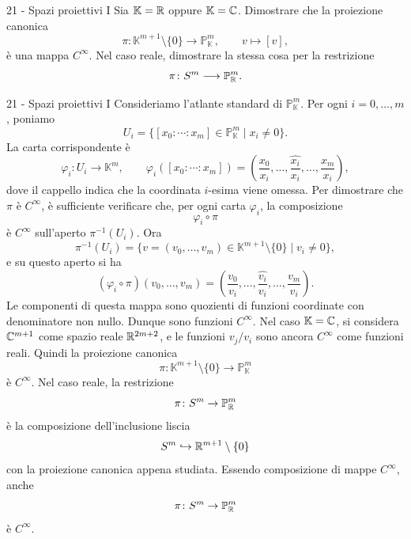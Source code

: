 \documentclass[a4paper]{article}
\begin{document}
\begin{snippetexercise}{21 - Spazi proiettivi I}
    Sia \(\mathbb{K}=\mathbb{R}\) oppure
    \(\mathbb{K}=\mathbb{C}\). Dimostrare che la proiezione canonica
    \[
        \pi\colon \mathbb{K}^{m+1}\setminus\{0\}\longrightarrow
        \mathbb{P}^m_{\mathbb{K}},
        \qquad
        v\longmapsto [v],
    \]
    è una mappa \(C^\infty\). Nel caso reale, dimostrare la stessa cosa
    per la restrizione
    \[
        \pi\colon S^m\longrightarrow \mathbb{P}^m_{\mathbb{R}}.
    \]
\end{snippetexercise}

\begin{snippetsolution}{21 - Spazi proiettivi I}
    Consideriamo l'atlante standard di \(\mathbb{P}^m_{\mathbb{K}}\). Per ogni \(i=0,\dots,m\), poniamo
    \[
        U_i=\{[x_0:\cdots:x_m]\in\mathbb{P}^m_{\mathbb{K}}\mid x_i\neq0\}.
    \]
    La carta corrispondente è
    \[
        \varphi_i\colon U_i\to\mathbb{K}^m,
        \qquad
        \varphi_i([x_0:\cdots:x_m])
        =
        \left(
            \frac{x_0}{x_i},\dots,\widehat{\frac{x_i}{x_i}},\dots,\frac{x_m}{x_i}
        \right),
    \]
    dove il cappello indica che la coordinata \(i\)-esima viene omessa.
    Per dimostrare che \(\pi\) è \(C^\infty\), è sufficiente verificare che, per ogni carta \(\varphi_i\), la composizione
    \[
        \varphi_i\circ\pi
    \]
    è \(C^\infty\) sull'aperto \(\pi^{-1}(U_i)\). Ora
    \[
        \pi^{-1}(U_i)=\{v=(v_0,\dots,v_m)\in\mathbb{K}^{m+1}\setminus\{0\}\mid v_i\neq0\},
    \]
    e su questo aperto si ha
    \[
        (\varphi_i\circ\pi)(v_0,\dots,v_m)
        =
        \left(
            \frac{v_0}{v_i},\dots,\widehat{\frac{v_i}{v_i}},\dots,\frac{v_m}{v_i}
        \right).
    \]
    Le componenti di questa mappa sono quozienti di funzioni coordinate con denominatore non nullo. Dunque sono funzioni \(C^\infty\). Nel caso \(\mathbb{K}=\mathbb{C}\), si considera \(\mathbb{C}^{m+1}\) come spazio reale \(\mathbb{R}^{2m+2}\), e le funzioni \(v_j/v_i\) sono ancora \(C^\infty\) come funzioni reali. Quindi la proiezione canonica
    \[
        \pi\colon \mathbb{K}^{m+1}\setminus\{0\}\to\mathbb{P}^m_{\mathbb{K}}
    \]
    è \(C^\infty\).
    Nel caso reale, la restrizione
    \[
        \pi\colon S^m\to\mathbb{P}^m_{\mathbb{R}}
    \]
    è la composizione dell'inclusione liscia
    \[
        S^m\hookrightarrow \mathbb{R}^{m+1}\setminus\{0\}
    \]
    con la proiezione canonica appena studiata. Essendo composizione di mappe \(C^\infty\), anche
    \[
        \pi\colon S^m\to\mathbb{P}^m_{\mathbb{R}}
    \]
    è \(C^\infty\).
\end{snippetsolution}
\end{document}
